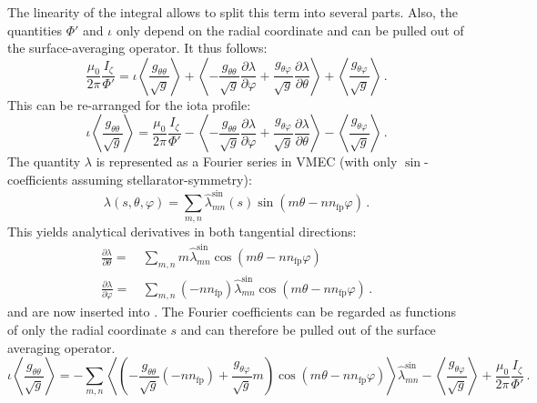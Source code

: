 The linearity of the integral allows to split this term into several parts.
Also, the quantities $\Phi'$ and $\iota$ only depend on the radial coordinate
and can be pulled out of the surface-averaging operator.
It thus follows:
\begin{equation}
 \frac{\mu_0}{2 \pi} \frac{I_\zeta}{\Phi'}
 =
 \iota \left\langle \frac{g_{\theta  \theta}}{\sqrt{g}} \right\rangle
 + \left\langle - \frac{g_{\theta  \theta }}{\sqrt{g}} \frac{\partial \lambda}{\partial \varphi}
                + \frac{g_{\theta  \varphi}}{\sqrt{g}} \frac{\partial \lambda}{\partial \theta } \right\rangle
 + \left\langle \frac{g_{\theta  \varphi}}{\sqrt{g}} \right\rangle \, .
\end{equation}
This can be re-arranged for the iota profile:
\begin{equation}
 \iota \left\langle \frac{g_{\theta  \theta}}{\sqrt{g}} \right\rangle
 =
 \frac{\mu_0}{2 \pi} \frac{I_\zeta}{\Phi'}
 - \left\langle - \frac{g_{\theta  \theta }}{\sqrt{g}} \frac{\partial \lambda}{\partial \varphi}
                + \frac{g_{\theta  \varphi}}{\sqrt{g}} \frac{\partial \lambda}{\partial \theta } \right\rangle
 - \left\langle \frac{g_{\theta  \varphi}}{\sqrt{g}} \right\rangle \label{eqn:iota_eqn} \, .
\end{equation}
The quantity $\lambda$ is represented as a Fourier series in VMEC
(with only $\sin$-coefficients assuming stellarator-symmetry):
\begin{equation}
 \lambda(s, \theta, \varphi)
 =
 \sum\limits_{m,n}
   \hat{\lambda}^{\sin}_{mn}(s)
   \sin\left(m \theta - n n_\textrm{fp} \varphi \right) \, .
\end{equation}
This yields analytical derivatives in both tangential directions:
\begin{align}
 \frac{\partial \lambda}{\partial \theta}
 =&\, \sum\limits_{m,n}
        m
        \hat{\lambda}^{\sin}_{mn}
        \cos\left(m \theta - n n_\textrm{fp} \varphi \right) \label{eqn:lu} \\
 \frac{\partial \lambda}{\partial \varphi}
 =&\, \sum\limits_{m,n}
        (-n n_\textrm{fp})
        \hat{\lambda}^{\sin}_{mn}
        \cos\left(m \theta - n n_\textrm{fp} \varphi \right) \label{eqn:lv} \, .
\end{align}
 and  are now inserted into .
The Fourier coefficients can be regarded as functions
of only the radial coordinate $s$ and can therefore be pulled out of the surface averaging operator.
\begin{equation}
 \iota \left\langle \frac{g_{\theta  \theta}}{\sqrt{g}} \right\rangle
 =
 - \sum\limits_{m,n} \left\langle \left(- \frac{g_{\theta  \theta }}{\sqrt{g}} (-n n_\textrm{fp})
                                        + \frac{g_{\theta  \varphi}}{\sqrt{g}}   m
                                  \right) \cos\left(m \theta - n n_\textrm{fp} \varphi \right)
                      \right\rangle
                      \hat{\lambda}^{\sin}_{mn}
 - \left\langle \frac{g_{\theta  \varphi}}{\sqrt{g}} \right\rangle
 + \frac{\mu_0}{2 \pi} \frac{I_\zeta}{\Phi'} \label{eqn:full_iota} \, .
\end{equation}
